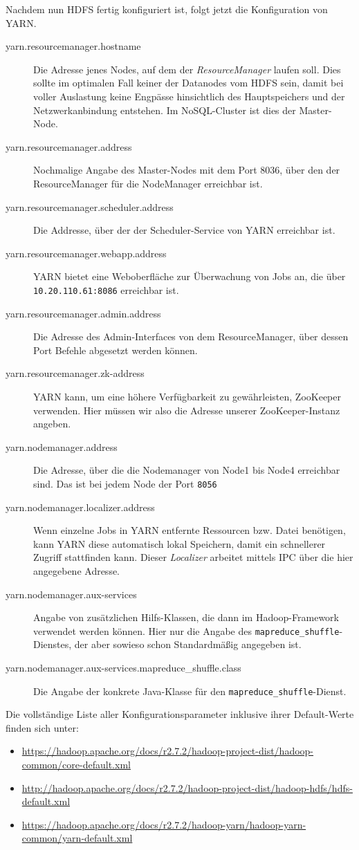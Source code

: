 Nachdem nun HDFS fertig konfiguriert ist, folgt jetzt die Konfiguration von YARN.
\lstset{basicstyle=\small}


\begin{description}
	\item[yarn.resourcemanager.hostname] Die Adresse jenes Nodes, auf dem der \textit{ResourceManager} laufen soll.
	Dies sollte im optimalen Fall keiner der Datanodes vom HDFS sein, damit bei voller Auslastung keine Engpässe hinsichtlich
	des Hauptspeichers und der Netzwerkanbindung entstehen. Im NoSQL-Cluster ist dies der Master-Node.
	\item[yarn.resourcemanager.address] Nochmalige Angabe des Master-Nodes mit dem Port 8036, über den der
	ResourceManager für die NodeManager erreichbar ist.
	\item[yarn.resourcemanager.scheduler.address] Die Addresse, über der der Scheduler-Service von YARN erreichbar ist.
	\item[yarn.resourcemanager.webapp.address] YARN bietet eine Weboberfläche zur Überwachung von Jobs an, die über \texttt{10.20.110.61:8086} 
	erreichbar ist.
	\item[yarn.resourcemanager.admin.address] Die Adresse des Admin-Interfaces von dem ResourceManager, über dessen Port Befehle abgesetzt werden können.
	\item[yarn.resourcemanager.zk-address] YARN kann, um eine höhere Verfügbarkeit zu gewährleisten, ZooKeeper verwenden. Hier müssen wir also die Adresse unserer
	ZooKeeper-Instanz angeben.
	\item[yarn.nodemanager.address] Die Adresse, über die die Nodemanager von Node1 bis Node4 erreichbar sind. Das ist bei jedem Node der Port \texttt{8056}
	\item[yarn.nodemanager.localizer.address] Wenn einzelne Jobs in YARN entfernte Ressourcen bzw. Datei benötigen, kann YARN diese automatisch lokal Speichern,
	damit ein schnellerer Zugriff stattfinden kann. Dieser \textit{Localizer} arbeitet mittels IPC über die hier angegebene Adresse.
	\item[yarn.nodemanager.aux-services] Angabe von zusätzlichen Hilfs-Klassen, die dann im Hadoop-Framework verwendet werden können. Hier nur die Angabe des \texttt{mapreduce\_shuffle}-Dienstes, der aber sowieso schon Standardmäßig angegeben ist.
	\item[yarn.nodemanager.aux-services.mapreduce\_shuffle.class] Die Angabe der konkrete Java-Klasse für den \texttt{mapreduce\_shuffle}-Dienst.
\end{description}

Die vollständige Liste aller Konfigurationsparameter inklusive ihrer Default-Werte finden sich unter:

\begin{itemize}
	\item \url{https://hadoop.apache.org/docs/r2.7.2/hadoop-project-dist/hadoop-common/core-default.xml}
	\item \url{http://hadoop.apache.org/docs/r2.7.2/hadoop-project-dist/hadoop-hdfs/hdfs-default.xml}
	\item \url{https://hadoop.apache.org/docs/r2.7.2/hadoop-yarn/hadoop-yarn-common/yarn-default.xml}
\end{itemize}
